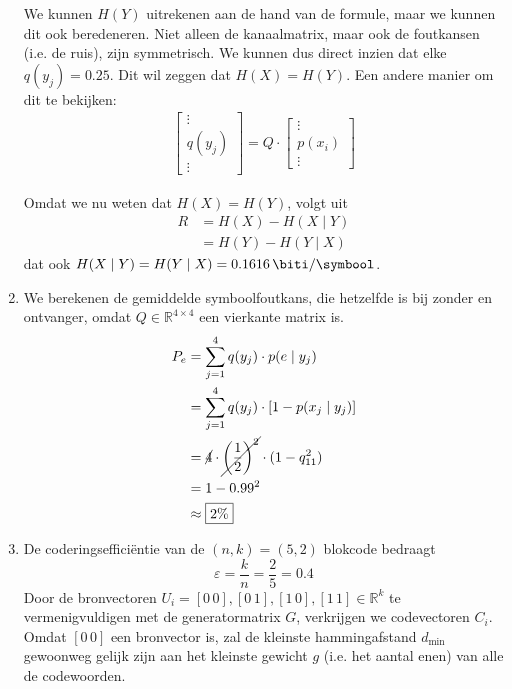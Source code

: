 \documentclass{kuburgiearticle}
\newcommand{\R}{\mathbb{R}} %
\begin{document}
\begin{enumerate}
		We kunnen \(H(Y)\) uitrekenen aan de hand van de formule, maar we kunnen dit ook beredeneren. Niet alleen de kanaalmatrix, maar ook de foutkansen (i.e. de ruis), zijn symmetrisch. We kunnen dus direct inzien dat elke \(q(y_j) = 0.25\). Dit wil zeggen dat \(H(X)=H(Y)\). Een andere manier om dit te bekijken: \begin{align*}
			\begin{bmatrix}
				\vdots \\
				q(y_j) \\
				\vdots
			\end{bmatrix} = Q \cdot \begin{bmatrix}
			\vdots \\
			p(x_i) \\
			\vdots
			\end{bmatrix}
		\end{align*}

		Omdat we nu weten dat \(H(X)=H(Y)\), volgt uit \begin{align*}
			R&=H(X)-H(X \mid Y)\\&=H(Y)-H(Y\mid X)
		\end{align*} dat ook \(H(X\mid Y)=H(Y\mid X)=\SI{0.1616}{\biti \per \symbool}\).

		\item We berekenen de gemiddelde symboolfoutkans, die hetzelfde is bij zonder en ontvanger, omdat \(Q \in \R^{4\times 4}\) een vierkante matrix is.
		\begin{align*}
			P_e &= \sum_{j=1}^{4}q(y_j)\cdot p(e\mid y_j)\\
				&= \sum_{j=1}^{4}q(y_j)\cdot [1-p(x_j\mid y_j)]\\
				&= \cancel{4} \cdot\cancel{ \left(\frac{1}{2}\right)^2} \cdot (1-q_{11}^2)\\
				&= 1-0.99^2\\
				&\approx \boxed{2\%}
		\end{align*}

		\item De coderingsefficiëntie van de \((n,k)=(5,2)\) blokcode bedraagt \[\varepsilon = \frac{k}{n}=\frac{2}{5}=\boxed{0.4}\] Door de bronvectoren \(U_i = [0 \, 0],[0 \, 1],[1 \, 0], [1 \, 1] \in \R^k\) te vermenigvuldigen met de generatormatrix \(G\), verkrijgen we codevectoren \(C_i\). Omdat \([0 \, 0]\) een bronvector is, zal de kleinste hammingafstand \(d_{\text{min}}\) gewoonweg gelijk zijn aan het kleinste gewicht \(g\) (i.e. het aantal enen) van alle de codewoorden.


\end{enumerate}
\end{document}
